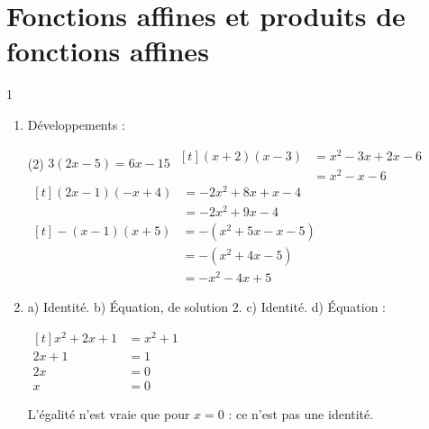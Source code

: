 \documentclass[10pt,a4paper]{article}
\begin{document}

\section{Fonctions affines et produits de fonctions affines}

\begin{corr}{1}
\begin{enumerate}[leftmargin=*]
    \item Développements :
    \begin{tasks}[after-item-skip=0.3cm](2)
        \task \(3(2x-5)=6x-15\)
        \task \(\begin{aligned}[t] (x+2)(x-3)&=x^2-3x+2x-6\\ &=x^2-x-6\end{aligned}\)
        \task \(\begin{aligned}[t] (2x-1)(-x+4)&=-2x^2+8x+x-4\\ &=-2x^2+9x-4\end{aligned}\)
        \task \(\begin{aligned}[t] -(x-1)(x+5)&=-(x^2+5x-x-5)\\ &=-(x^2+4x-5)\\ &=-x^2-4x+5\end{aligned}\)
    \end{tasks}
    \item a) Identité. \quad b) Équation, de solution \(2\). \quad c) Identité. \quad d) Équation :

    \(\begin{aligned}[t] x^2+2x+1&=x^2+1\\ 2x+1&=1\\ 2x&=0\\ x&=0\end{aligned}\)

    L'égalité n'est vraie que pour \(x=0\) : ce n'est pas une identité.
\end{enumerate}
\end{corr}
\end{document}
